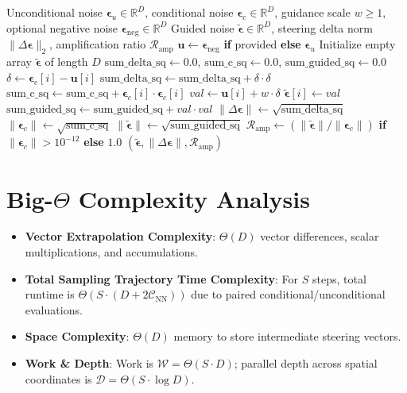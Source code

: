 \documentclass[11pt,a4paper]{article}
\theoremstyle{definition}
\begin{document}
\begin{algorithm}[H]
\caption{Classifier-Free Guidance Vector Extrapolation}
\begin{algorithmic}[1]
\Require Unconditional noise $\boldsymbol{\epsilon}_u \in \mathbb{R}^D$, conditional noise $\boldsymbol{\epsilon}_c \in \mathbb{R}^D$, guidance scale $w \ge 1$, optional negative noise $\boldsymbol{\epsilon}_{\text{neg}} \in \mathbb{R}^D$
\Ensure Guided noise $\tilde{\boldsymbol{\epsilon}} \in \mathbb{R}^D$, steering delta norm $\|\Delta \boldsymbol{\epsilon}\|_2$, amplification ratio $\mathcal{R}_{\text{amp}}$
\State $\mathbf{u} \gets \boldsymbol{\epsilon}_{\text{neg}}$ \textbf{if} provided \textbf{else} $\boldsymbol{\epsilon}_u$
\State Initialize empty array $\tilde{\boldsymbol{\epsilon}}$ of length $D$
\State $\text{sum\_delta\_sq} \gets 0.0$, $\text{sum\_c\_sq} \gets 0.0$, $\text{sum\_guided\_sq} \gets 0.0$
    \State $\delta \gets \boldsymbol{\epsilon}_c[i] - \mathbf{u}[i]$
    \State $\text{sum\_delta\_sq} \gets \text{sum\_delta\_sq} + \delta \cdot \delta$
    \State $\text{sum\_c\_sq} \gets \text{sum\_c\_sq} + \boldsymbol{\epsilon}_c[i] \cdot \boldsymbol{\epsilon}_c[i]$
    \State $val \gets \mathbf{u}[i] + w \cdot \delta$
    \State $\tilde{\boldsymbol{\epsilon}}[i] \gets val$
    \State $\text{sum\_guided\_sq} \gets \text{sum\_guided\_sq} + val \cdot val$
\EndFor
\State $\|\Delta \boldsymbol{\epsilon}\| \gets \sqrt{\text{sum\_delta\_sq}}$
\State $\|\boldsymbol{\epsilon}_c\| \gets \sqrt{\text{sum\_c\_sq}}$
\State $\|\tilde{\boldsymbol{\epsilon}}\| \gets \sqrt{\text{sum\_guided\_sq}}$
\State $\mathcal{R}_{\text{amp}} \gets (\|\tilde{\boldsymbol{\epsilon}}\| / \|\boldsymbol{\epsilon}_c\|)$ \textbf{if} $\|\boldsymbol{\epsilon}_c\| > 10^{-12}$ \textbf{else} $1.0$
\State \Return $(\tilde{\boldsymbol{\epsilon}}, \|\Delta \boldsymbol{\epsilon}\|, \mathcal{R}_{\text{amp}})$
\end{algorithmic}
\end{algorithm}

\section{Big-$\Theta$ Complexity Analysis}

\begin{itemize}
    \item \textbf{Vector Extrapolation Complexity}: $\Theta(D)$ vector differences, scalar multiplications, and accumulations.
    \item \textbf{Total Sampling Trajectory Time Complexity}: For $S$ steps, total runtime is $\Theta(S \cdot (D + 2 \mathcal{C}_{\text{NN}}))$ due to paired conditional/unconditional evaluations.
    \item \textbf{Space Complexity}: $\Theta(D)$ memory to store intermediate steering vectors.
    \item \textbf{Work \& Depth}: Work is $\mathcal{W} = \Theta(S \cdot D)$; parallel depth across spatial coordinates is $\mathcal{D} = \Theta(S \cdot \log D)$.
\end{itemize}
\end{document}
